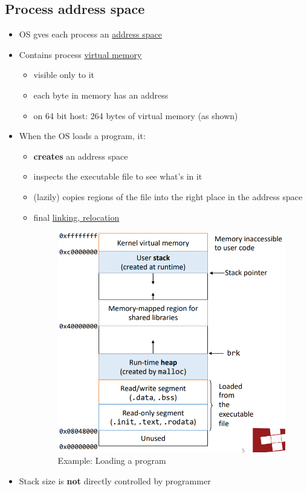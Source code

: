 \documentclass[a4paper,10pt]{article}
\begin{document}
\subsection{Process address space}
\begin{itemize}
    \item OS gves each process an \underline{address space}
    \item  Contains process \underline{virtual memory}
    \begin{itemize}
        \item visible only to it
        \item each byte in memory has an address
        \item on 64 bit host: 264 bytes of virtual memory (as shown)
    \end{itemize}
    \item When the OS loads a program, it:
    \begin{itemize}
        \item \textbf{creates} an address space
        \item inspects the executable file to see what’s in it        
        \item (lazily) copies regions of the file into the right place in the address space
        \item final \underline{linking, relocation}
        \begin{figure}[H]
            \centering
            \includegraphics[width=0.65\linewidth]{Pictures/e19.png}
            \caption{Example: Loading a program}
            \label{fig:enter-label}
        \end{figure}
    \end{itemize}
    \item Stack size is \textbf{not} directly controlled by programmer
\end{itemize}
\end{document}
